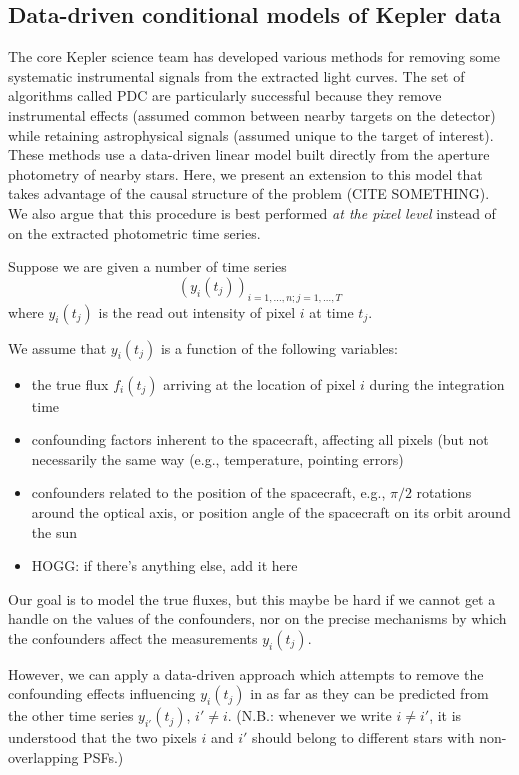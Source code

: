 \documentclass[letterpaper,12pt,preprint]{aastex}
\begin{document}
\subsection{Data-driven conditional models of Kepler data}

The core Kepler science team has developed various methods for removing some
systematic instrumental signals from the extracted light curves.
The set of algorithms called PDC \citep{map-pdc1,map-pdc2} are particularly
successful because they remove instrumental effects (assumed common between
nearby targets on the detector) while retaining astrophysical signals (assumed
unique to the target of interest).
These methods use a data-driven linear model built directly from the aperture
photometry of nearby stars.
Here, we present an extension to this model that takes advantage of the causal
structure of the problem (CITE SOMETHING).
We also argue that this procedure is best performed \emph{at the pixel level}
instead of on the extracted photometric time series.


Suppose we are given a number of time series
$$(y_i(t_j))_{i=1,\dots,n; j=1,\dots,T}$$
where $y_i(t_j)$ is the read out intensity of pixel $i$ at time $t_j$.

We assume that $y_i(t_j)$ is a function of the following variables:
\begin{itemize}
\item
the true flux $f_i(t_j)$ arriving at the location of pixel $i$ during the
integration time
\item
confounding factors inherent to the spacecraft, affecting all pixels (but not
necessarily the same way (e.g., temperature, pointing errors)
\item
confounders related to the position of the spacecraft, e.g., $\pi/2$ rotations
around the optical axis, or position angle of the spacecraft on its orbit
around the sun
\item
HOGG: if there's anything else, add it here
\end{itemize}

Our goal is to model the true fluxes, but this maybe be hard if we cannot get
a handle on the values of the confounders, nor on the precise mechanisms by
which the confounders affect the measurements $y_i(t_j)$.

However, we can apply a data-driven approach which attempts to remove the
confounding effects influencing $y_i(t_j)$ in as far as they can be predicted
from the other time series $y_{i'}(t_j)$, $i'\ne i$. (N.B.: whenever we write
$i\ne i'$, it is understood that the two pixels $i$ and $i'$ should belong to
different stars with non-overlapping PSFs.)
\end{document}
